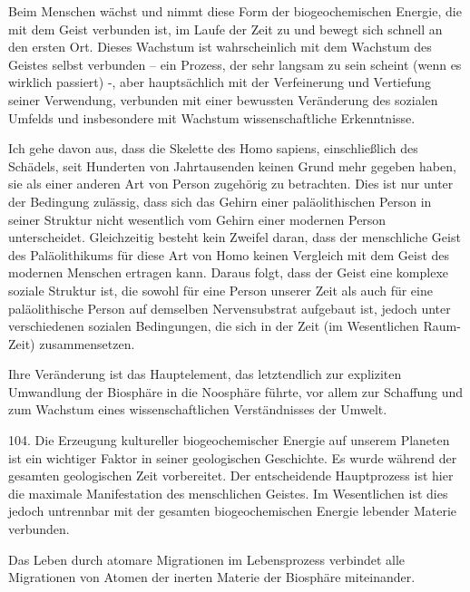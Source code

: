 \documentclass[11pt,a4paper]{book}
\begin{document}
Beim Menschen wächst und nimmt diese Form der biogeochemischen Energie, die mit dem Geist verbunden ist, im Laufe der Zeit zu und bewegt sich schnell an den ersten Ort. Dieses Wachstum ist wahrscheinlich mit dem Wachstum des Geistes selbst verbunden -- ein Prozess, der sehr langsam zu sein scheint (wenn es wirklich passiert) -, aber hauptsächlich mit der Verfeinerung und Vertiefung seiner Verwendung, verbunden mit einer bewussten Veränderung des sozialen Umfelds und insbesondere mit Wachstum wissenschaftliche Erkenntnisse.



Ich gehe davon aus, dass die Skelette des Homo sapiens, einschließlich des Schädels, seit Hunderten von Jahrtausenden keinen Grund mehr gegeben haben, sie als einer anderen Art von Person zugehörig zu betrachten. Dies ist nur unter der Bedingung zulässig, dass sich das Gehirn einer paläolithischen Person in seiner Struktur nicht wesentlich vom Gehirn einer modernen Person unterscheidet. Gleichzeitig besteht kein Zweifel daran, dass der menschliche Geist des Paläolithikums für diese Art von Homo keinen Vergleich mit dem Geist des modernen Menschen ertragen kann. Daraus folgt, dass der Geist eine komplexe soziale Struktur ist, die sowohl für eine Person unserer Zeit als auch für eine paläolithische Person auf demselben Nervensubstrat aufgebaut ist, jedoch unter verschiedenen sozialen Bedingungen, die sich in der Zeit (im Wesentlichen Raum-Zeit) zusammensetzen.



Ihre Veränderung ist das Hauptelement, das letztendlich zur expliziten Umwandlung der Biosphäre in die Noosphäre führte, vor allem zur Schaffung und zum Wachstum eines wissenschaftlichen Verständnisses der Umwelt.



104. Die Erzeugung kultureller biogeochemischer Energie auf unserem Planeten ist ein wichtiger Faktor in seiner geologischen Geschichte. Es wurde während der gesamten geologischen Zeit vorbereitet. Der entscheidende Hauptprozess ist hier die maximale Manifestation des menschlichen Geistes. Im Wesentlichen ist dies jedoch untrennbar mit der gesamten biogeochemischen Energie lebender Materie verbunden.



Das Leben durch atomare Migrationen im Lebensprozess verbindet alle Migrationen von Atomen der inerten Materie der Biosphäre miteinander.
\end{document}
